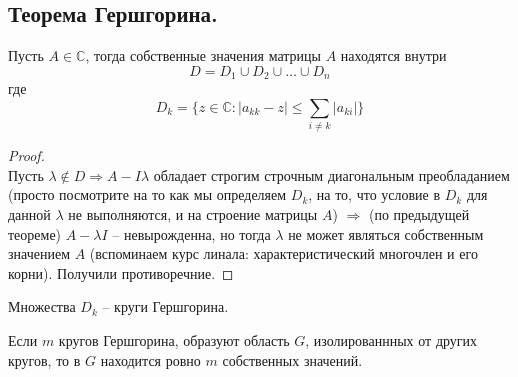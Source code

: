 \subsection{Теорема Гершгорина.}
\begin{theorem*}
    Пусть $A \in \mathbb{C}$, тогда собственные значения матрицы $A$ находятся внутри\\
    \[D = D_1 \cup D_2 \cup \ldots \cup D_n\] где
    \[ \displaystyle D_k = \{z \in \mathbb{C} : |a_{kk} - z| \leqslant \sum_{i \neq k}|a_{ki}|\}\]  
\end{theorem*}
\begin{proof} \ \\
    Пусть $\lambda \not \in D \Rightarrow A - I\lambda$ обладает строгим строчным
    диагональным преобладанием (просто посмотрите на то как мы определяем $D_k$, на то, что условие
    в $D_k$ для данной $\lambda$ не выполняются, и на строение
    матрицы $A$) $\Rightarrow$ (по предыдущей теореме) $A - \lambda I$ -- невырожденна, но
    тогда $\lambda$ не может являться собственным значением $A$ (вспоминаем курс линала: характеристический
    многочлен и его корни). Получили противоречние.
\end{proof}

\begin{definition*}
    Множества $D_k$ -- круги Гершгорина.
\end{definition*}


\begin{theorem*}
    Если $m$ кругов Гершгорина, образуют область $G$, изолированнных от других кругов, то в $G$ находится ровно
    $m$ собственных значений.
\end{theorem*}
